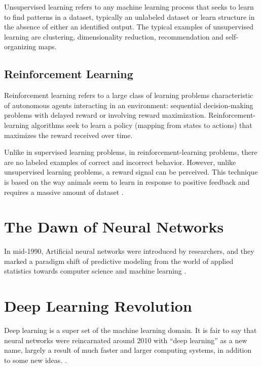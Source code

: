 Unsupervised learning \cite{sammut2011encyclopedia} refers to any machine learning process that seeks to learn to find patterns in a dataset, typically an unlabeled dataset or learn structure in the absence of either an identified output. The typical examples of unsupervised learning are clustering, dimensionality reduction, recommendation and self-organizing maps.

\subsection*{Reinforcement Learning}

Reinforcement learning \cite{sammut2011encyclopedia} refers to a large class of learning problems characteristic of autonomous agents interacting in an environment: sequential decision-making problems with delayed reward or involving reward maximization. Reinforcement-learning algorithms seek to learn a policy (mapping from states to actions) that maximizes the reward received over time.

Unlike in supervised learning problems, in reinforcement-learning problems, there are no labeled examples of correct and incorrect behavior. However, unlike unsupervised learning problems, a reward signal can be perceived. This technique is based on the way animals seem to learn in response to positive feedback and requires a massive amount of dataset \cite{sammut2011encyclopedia}.

\section{The Dawn of Neural Networks}
In mid-1990, Artificial neural networks were introduced by researchers, and they marked a paradigm shift of predictive modeling from the world of applied statistics towards computer science and machine learning \cite{efron2016computer}.

\section{Deep Learning Revolution}

Deep learning is a super set of the machine learning domain. It is fair to say that neural networks were reincarnated around 2010 with “deep learning” as a new name, largely a result of much faster and larger computing systems, in addition to some new ideas. \cite{efron2016computer}.

